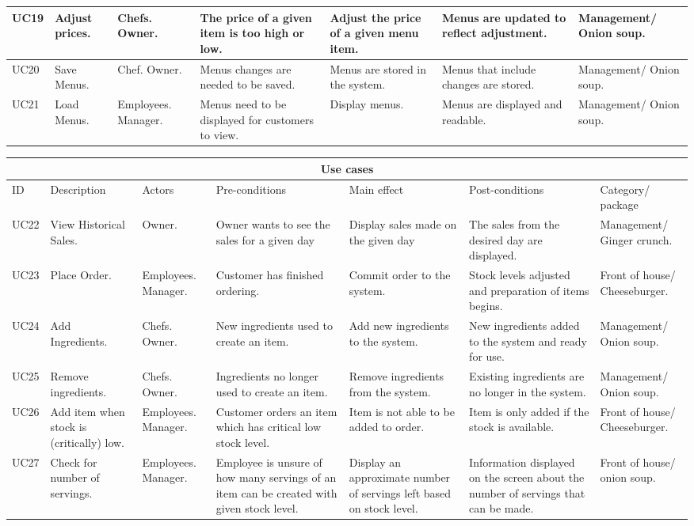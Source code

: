\begin{tabularx}{\linewidth}{|X|X|X|X|X|X|X|}
\hline
UC19 & Adjust prices. & Chefs. Owner. & The price of a given item is too high or low. & Adjust the price of a given menu item. & Menus are updated to reflect adjustment. & Management/ Onion soup. \\
\hline
UC20 & Save Menus. & Chef. Owner. & Menus changes are needed to be saved. & Menus are stored in the system. & Menus that include changes are stored. & Management/ Onion soup. \\
\hline
UC21 & Load Menus. & Employees. Manager. & Menus need to be displayed for customers to view. & Display menus. & Menus are displayed and readable. & Management/ Onion soup. \\
\hline
\end{tabularx}
\begin{tabularx}{\linewidth}{|X|X|X|X|X|X|X|}
\hline
\multicolumn{7}{c}{ Use cases } \\
\hline
ID & Description & Actors & Pre-conditions & Main effect & Post-conditions & Category/ package \\
\hline
UC22 & View Historical Sales. & Owner. & Owner wants to see the sales for a given day& Display sales made on the given day& The sales from the desired day are displayed. & Management/ Ginger crunch. \\
\hline
UC23 & Place Order. & Employees. Manager. & Customer has finished ordering. & Commit order to the system. & Stock levels adjusted and preparation of items begins. & Front of house/ Cheeseburger. \\
\hline
UC24 & Add Ingredients. & Chefs. Owner. & New ingredients used to create an item. & Add new ingredients to the system. & New ingredients added to the system and ready for use. & Management/ Onion soup. \\
\hline 
UC25 & Remove ingredients. & Chefs. Owner. & Ingredients no longer used to create an item. & Remove ingredients from the system. & Existing ingredients are no longer in the system. & Management/ Onion soup. \\
\hline
UC26 & Add item when stock is (critically) low. & Employees. Manager. & Customer orders an item which has critical low stock level. & Item is not able to be added to order. & Item is only added if the stock is available. & Front of house/ Cheeseburger. \\
\hline
UC27 & Check for number of servings. & Employees. Manager. & Employee is unsure of how many servings of an item can be created with given stock level. & Display an approximate number of servings left based on stock level. & Information displayed on the screen about the number of servings that can be made. & Front of house/ onion soup. \\

\end{tabularx}
